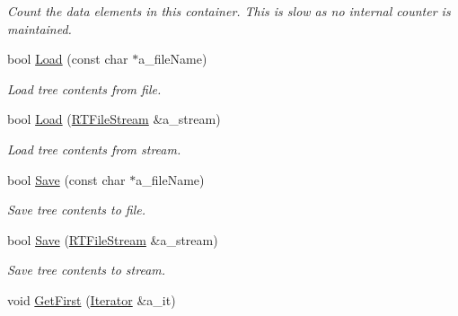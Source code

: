 \begin{DoxyCompactItemize}
\begin{DoxyCompactList}\small\item\em \-Count the data elements in this container. \-This is slow as no internal counter is maintained. \end{DoxyCompactList}\item 
\hypertarget{class_r_tree_adbd1f87715d22ed75b2b8be738583fc2}{bool \hyperlink{class_r_tree_adbd1f87715d22ed75b2b8be738583fc2}{\-Load} (const char $\ast$a\-\_\-file\-Name)}\label{class_r_tree_adbd1f87715d22ed75b2b8be738583fc2}

\begin{DoxyCompactList}\small\item\em \-Load tree contents from file. \end{DoxyCompactList}\item 
\hypertarget{class_r_tree_ad02dc25a34d9b5b291c8ff3f1b002b09}{bool \hyperlink{class_r_tree_ad02dc25a34d9b5b291c8ff3f1b002b09}{\-Load} (\hyperlink{class_r_t_file_stream}{\-R\-T\-File\-Stream} \&a\-\_\-stream)}\label{class_r_tree_ad02dc25a34d9b5b291c8ff3f1b002b09}

\begin{DoxyCompactList}\small\item\em \-Load tree contents from stream. \end{DoxyCompactList}\item 
\hypertarget{class_r_tree_a6817692e1e8e416843be1ea628f7a074}{bool \hyperlink{class_r_tree_a6817692e1e8e416843be1ea628f7a074}{\-Save} (const char $\ast$a\-\_\-file\-Name)}\label{class_r_tree_a6817692e1e8e416843be1ea628f7a074}

\begin{DoxyCompactList}\small\item\em \-Save tree contents to file. \end{DoxyCompactList}\item 
\hypertarget{class_r_tree_a7066ea753180537a3a870c84e4fcefce}{bool \hyperlink{class_r_tree_a7066ea753180537a3a870c84e4fcefce}{\-Save} (\hyperlink{class_r_t_file_stream}{\-R\-T\-File\-Stream} \&a\-\_\-stream)}\label{class_r_tree_a7066ea753180537a3a870c84e4fcefce}

\begin{DoxyCompactList}\small\item\em \-Save tree contents to stream. \end{DoxyCompactList}\item 
\hypertarget{class_r_tree_acbcbd987b4f6549cd53e373e01b74efa}{void \hyperlink{class_r_tree_acbcbd987b4f6549cd53e373e01b74efa}{\-Get\-First} (\hyperlink{class_r_tree_1_1_iterator}{\-Iterator} \&a\-\_\-it)}\label{class_r_tree_acbcbd987b4f6549cd53e373e01b74efa}


\end{DoxyCompactItemize}
